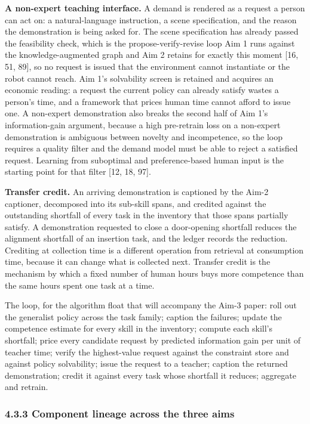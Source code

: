 \documentclass[
  11pt,
]{article}
\begin{document}
\textbf{A non-expert teaching interface.} A demand is rendered as a
request a person can act on: a natural-language instruction, a scene
specification, and the reason the demonstration is being asked for. The
scene specification has already passed the feasibility check, which is
the propose-verify-revise loop Aim 1 runs against the
knowledge-augmented graph and Aim 2 retains for exactly this moment
{[}16, 51, 89{]}, so no request is issued that the environment cannot
instantiate or the robot cannot reach. Aim 1's solvability screen is
retained and acquires an economic reading: a request the current policy
can already satisfy wastes a person's time, and a framework that prices
human time cannot afford to issue one. A non-expert demonstration also
breaks the second half of Aim 1's information-gain argument, because a
high pre-retrain loss on a non-expert demonstration is ambiguous between
novelty and incompetence, so the loop requires a quality filter and the
demand model must be able to reject a satisfied request. Learning from
suboptimal and preference-based human input is the starting point for
that filter {[}12, 18, 97{]}.

\textbf{Transfer credit.} An arriving demonstration is captioned by the
Aim-2 captioner, decomposed into its sub-skill spans, and credited
against the outstanding shortfall of every task in the inventory that
those spans partially satisfy. A demonstration requested to close a
door-opening shortfall reduces the alignment shortfall of an insertion
task, and the ledger records the reduction. Crediting at collection time
is a different operation from retrieval at consumption time, because it
can change what is collected next. Transfer credit is the mechanism by
which a fixed number of human hours buys more competence than the same
hours spent one task at a time.

The loop, for the algorithm float that will accompany the Aim-3 paper:
roll out the generalist policy across the task family; caption the
failures; update the competence estimate for every skill in the
inventory; compute each skill's shortfall; price every candidate request
by predicted information gain per unit of teacher time; verify the
highest-value request against the constraint store and against policy
solvability; issue the request to a teacher; caption the returned
demonstration; credit it against every task whose shortfall it reduces;
aggregate and retrain.

\hypertarget{component-lineage-across-the-three-aims}{%
\subsubsection{4.3.3 Component lineage across the three
aims}\label{component-lineage-across-the-three-aims}}
\end{document}
